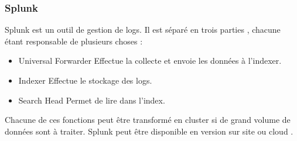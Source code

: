 \documentclass[paper=a4, fontsize=11pt]{scrartcl}
\begin{document}
\subsubsection{Splunk}
Splunk est un outil de gestion de logs. Il est séparé en trois \og parties \fg, chacune étant responsable de plusieurs choses :

\begin{itemize}
    \item Universal Forwarder
    \subitem Effectue la collecte et envoie les données à l'indexer.
    \item Indexer
    \subitem Effectue le stockage des logs.
    \item Search Head
    \subitem Permet de lire dans l'index.
\end{itemize}
Chacune de ces fonctions peut être transformé en cluster si de grand volume de données sont à traiter.
Splunk peut être disponible en version \og sur site \fg ou \og cloud \fg.
\end{document}
